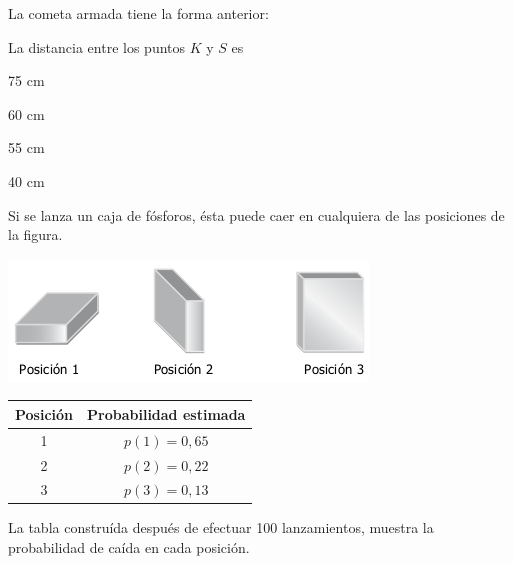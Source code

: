 \documentclass[letterpaper,fleqn]{article}
\begin{document}
\begin{enumerate}
\begin{minipage}{.5\textwidth}
\end{minipage}
\begin{minipage}{.45\textwidth}
La cometa armada tiene la forma anterior:
\end{minipage}
La distancia entre los puntos $K$ y $S$ es
\begin{enumerate}
\begin{multicols}{4}
\item 75 cm
\item 60 cm
\item 55 cm
\item 40 cm
\end{multicols}
\end{enumerate}

    \begin{minipage}{.4\textwidth}
      \item Si se lanza un caja de fósforos, ésta puede caer en cualquiera de las posiciones de la figura.
  \end{minipage}\hfill
  \begin{minipage}{.55\textwidth}
    \begin{center}
  \includegraphics[scale=.55]{Images/fosforos.png}
  \end{center}
  \end{minipage}
  \begin{minipage}{.5\textwidth}
      \begin{center}
  \begin{tabular}{|c|c|}\hline
  \textbf{Posición}&\textbf{Probabilidad estimada}\\\hline
    1 & $ p(1)=0,65 $\\\hline
    2 & $ p(2)=0,22 $\\\hline
    3 & $ p(3)=0,13 $\\\hline
  \end{tabular}
  \end{center}
  \end{minipage}\hfill
  \begin{minipage}{.45\textwidth}
    La tabla construída después de efectuar 100 lanzamientos, muestra la probabilidad de caída en cada posición.
  \end{minipage}
  

\end{enumerate}
\end{document}
